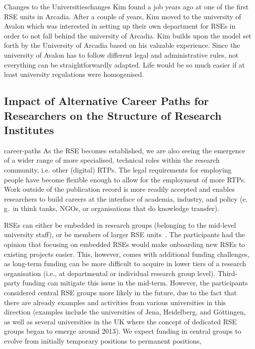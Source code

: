 \documentclass{eceasst}
\newcommand{\eg}{e.\,g.}
\begin{document}
\begin{story}{Changes to the Universities}{changes}
Kim found a job years ago at one of the first RSE units in Arcadia. After a couple of years, Kim moved to the university of
Avalon which was interested in setting up their own department for RSEs in order to not fall behind the university of Arcadia.
Kim builds upon the model set forth by the University of Arcadia based on his valuable experience. Since the university
of Avalon has to follow different legal and administrative rules, not everything can be straightforwardly adapted.
Life would be so much easier if at least university regulations were homogenised.
\end{story}

\subsection{Impact of Alternative Career Paths for Researchers on the Structure of Research Institutes}
\begin{whatis}{}{career-paths}
As the RSE becomes established, we are also seeing the emergence of a wider range of more specialised, technical roles within the research community, i.e. other (digital) RTPs.
The legal requirements for employing people have become flexible enough to allow for the employment of more RTPs.
Work outside of the publication record is more readily accepted and enables researchers to build careers at the interface of academia, industry, and policy
(\eg\ in think tanks, NGOs, or organisations that do knowledge transfer).
\end{whatis}
RSEs can either be embedded in research groups (belonging to the mid-level university staff),
or be members of larger RSE units~\cite{Kempf2025-draft}.
The participants had the opinion that focusing on embedded RSEs would make onboarding new RSEs to existing projects easier.
This, however, comes with additional funding challenges,
as long-term funding can be more difficult to acquire in lower tiers of a research organisation (i.e., at departmental or individual research group level).
Third-party funding can mitigate this issue in the mid-term.
However, the participants considered central RSE groups more likely in the future,
due to the fact that there are already examples and activities from various universities in this direction
(examples include the universities of Jena, Heidelberg, and Göttingen, as well as several universities
in the UK where the concept of dedicated RSE groups began to emerge around 2013).
We expect funding in central groups to evolve from initially temporary positions to permanent positions,
\end{document}
